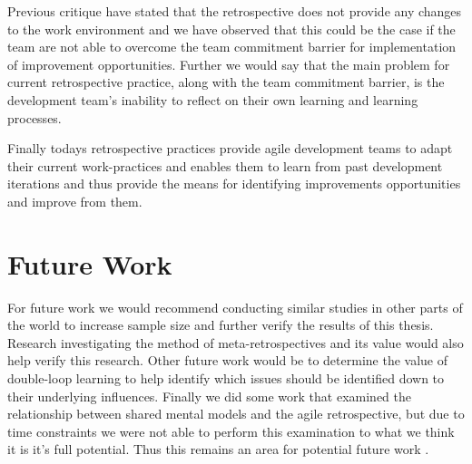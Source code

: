 Previous critique \cite{Drury2012} have stated that the retrospective does not provide any changes to the work environment and we have observed that this could be the case if the team are not able to overcome the team commitment barrier for implementation of improvement opportunities. Further we would say that the main problem for current retrospective practice, along with the team commitment barrier, is the development team's inability to reflect on their own learning and learning processes. 

Finally todays retrospective practices provide agile development teams to adapt their current work-practices and enables them to learn from past development iterations and thus provide the means for identifying improvements opportunities and improve from them. 

\section{Future Work}
For future work we would recommend conducting similar studies in other parts of the world to increase sample size and further verify the results of this thesis. Research investigating the method of meta-retrospectives and its value would also help verify this research. Other future work would be to determine the value of double-loop learning to help identify which issues should be identified down to their underlying influences. Finally we did some work that examined the relationship between shared mental models and the agile retrospective, but due to time constraints we were not able to perform this examination to what we think it is it's full potential. Thus this remains an area for potential future work .

